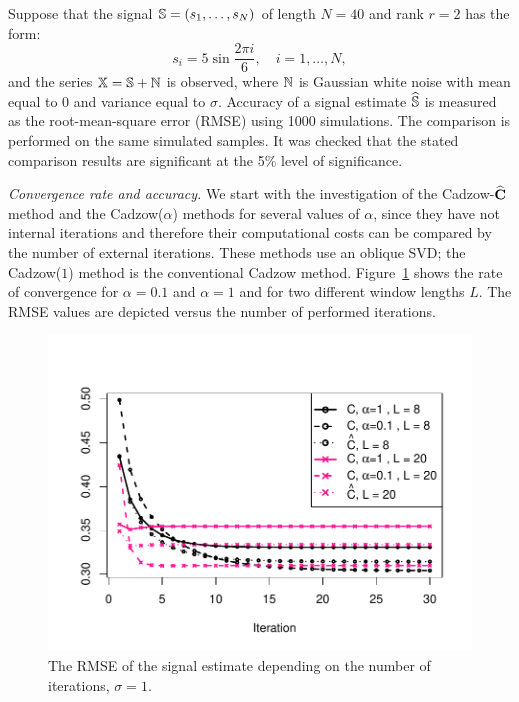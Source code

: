 \documentclass[sii]{ipart}
\begin{document}
Suppose that the signal $\mathbb{S} = (s_{1}, \ldots, s_N)$ of length $N = 40$ and rank $r=2$ has the form:
\begin{equation}
\label{eq:signal}
s_{i} = 5\sin{\frac{2 \pi i}{6}}, \quad i = 1, \ldots, N,
\end{equation}
and the series $\mathbb{X} = \mathbb{S} + \mathbb{N}$ is observed, where  $\mathbb{N}$ is Gaussian white noise with mean equal to $0$ and variance equal to $\sigma$. Accuracy of a signal estimate $\widehat{\mathbb{S}}$ is measured as the root-mean-square error (RMSE) using 1000 simulations. The comparison is performed on the same simulated samples. It was checked that the stated comparison results are significant at the 5\% level of significance.

\smallskip
\textit{Convergence rate and accuracy.} We start with the investigation of the Cadzow-$\widehat{\mathbf{C}}$ method and the Cadzow($\alpha$) methods for several values of $\alpha$, since they have not internal iterations and therefore their computational costs can be compared by the number of external iterations. These methods use an oblique SVD; the Cadzow($1$) method is the conventional Cadzow method. Figure~\ref{img_cadzowspeed2} shows the rate of convergence for $\alpha = 0.1$ and $\alpha = 1$ and for two different window lengths $L$. The RMSE values are depicted versus the number of performed iterations.

\begin{figure}[!hhh]
		\includegraphics[width = \columnwidth]{cadzowspeed_2.pdf}
		\caption{The RMSE of the signal estimate depending on the number of iterations,
        $\sigma=1$.}
		\label{img_cadzowspeed2}
\end{figure}
\end{document}
